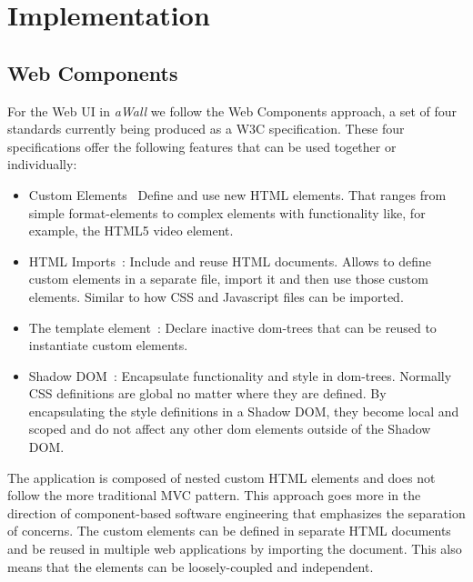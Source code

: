 \documentclass{sigchi}
\begin{document}
\section{Implementation}

\subsection{Web Components}
For the Web UI in \textit{aWall} we follow the Web Components  \cite{webcomponents.org} approach,  a set of four standards currently being produced as a W3C specification.
These four specifications offer the following features that can be used together or individually:
\begin{itemize}
	\item Custom Elements~\cite{CustomElements} Define and use new HTML elements. 
	That ranges from simple format-elements to complex elements with functionality like, for example, the HTML5 video element.
	
	\item HTML Imports~\cite{HTMLImports}: Include and reuse HTML documents.
	Allows to define custom elements in a separate file,  import it and then use those custom elements. 
	Similar to how CSS and Javascript files can be imported.
	
	\item The template element~\cite{TemplateElement}: Declare inactive \gls{dom}-trees that can be reused to instantiate custom elements.
	
	\item Shadow DOM~\cite{ShadowDOM}: Encapsulate functionality and style in \gls{dom}-trees.
	Normally CSS definitions are global no matter where they are defined.
	By encapsulating the style definitions in a Shadow DOM, they become local and scoped and do not affect any other \gls{dom} elements outside of the Shadow DOM.
\end{itemize}

The application is composed of nested custom HTML elements and does not follow the more traditional MVC pattern. 
This approach goes more in the direction of component-based software engineering that emphasizes the separation of concerns.
The custom elements can be defined in separate HTML documents and be reused in multiple web applications by importing the document.
This also means that the elements can be loosely-coupled and independent.
\end{document}
